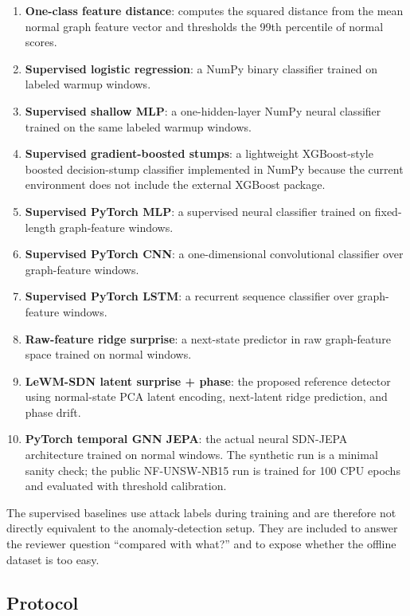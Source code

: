 \documentclass[runningheads]{llncs}
\begin{document}
\begin{enumerate}
  \item \textbf{One-class feature distance}: computes the squared distance from
  the mean normal graph feature vector and thresholds the 99th percentile of
  normal scores.
  \item \textbf{Supervised logistic regression}: a NumPy binary classifier
  trained on labeled warmup windows.
  \item \textbf{Supervised shallow MLP}: a one-hidden-layer NumPy neural
  classifier trained on the same labeled warmup windows.
  \item \textbf{Supervised gradient-boosted stumps}: a lightweight
  XGBoost-style boosted decision-stump classifier implemented in NumPy because
  the current environment does not include the external XGBoost package.
  \item \textbf{Supervised PyTorch MLP}: a supervised neural classifier trained
  on fixed-length graph-feature windows.
  \item \textbf{Supervised PyTorch CNN}: a one-dimensional convolutional
  classifier over graph-feature windows.
  \item \textbf{Supervised PyTorch LSTM}: a recurrent sequence classifier over
  graph-feature windows.
  \item \textbf{Raw-feature ridge surprise}: a next-state predictor in raw
  graph-feature space trained on normal windows.
  \item \textbf{LeWM-SDN latent surprise + phase}: the proposed reference
  detector using normal-state PCA latent encoding, next-latent ridge
  prediction, and phase drift.
  \item \textbf{PyTorch temporal GNN JEPA}: the actual neural SDN-JEPA
  architecture trained on normal windows. The synthetic run is a minimal sanity
  check; the public NF-UNSW-NB15 run is trained for 100 CPU epochs and evaluated
  with threshold calibration.
\end{enumerate}

The supervised baselines use attack labels during training and are therefore
not directly equivalent to the anomaly-detection setup. They are included to
answer the reviewer question ``compared with what?'' and to expose whether the
offline dataset is too easy.

\subsection{Protocol}
\end{document}
